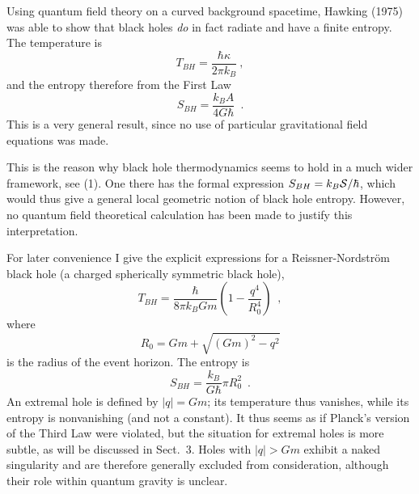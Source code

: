 \documentclass[12pt]{article}
\newcommand{\be}{\begin{equation}}
\newcommand{\ee}{\end{equation}}
\begin{document}
Using quantum field theory on a curved background
spacetime, Hawking (1975) was able to show that black holes
{\em do} in fact radiate and have a finite entropy. The temperature is
\be T_{BH}=\frac{\hbar\kappa}{2\pi k_B}\ , \ee
and the entropy therefore from the First Law
\be S_{BH}=\frac{k_BA}{4G\hbar}\enspace . \ee
This is a very general result, since no use of particular
gravitational field equations was made.

\vskip 2mm
\small

This is the reason why black hole thermodynamics seems to hold
in a much wider framework, see (1). One there has
the formal expression $S_{BH}=
k_B{\cal S}/\hbar$, which would thus give a general local geometric
notion of black hole entropy. However, no quantum field theoretical
calculation has been made to justify this interpretation.

\vskip 2mm
\normalsize

For later convenience I give the explicit expressions for a
Reissner-Nordstr\"om black hole (a charged spherically symmetric
black hole),
\be T_{BH}=\frac{\hbar}{8\pi k_BGm}\left(1-\frac{q^4}{R_0^4}
    \right)\enspace , \ee
where
\be R_0=Gm+\sqrt{(Gm)^2-q^2} \ee
is the radius of the event horizon. The entropy is
\be S_{BH}=\frac{k_B}{G\hbar}\pi R_0^2\enspace .\ee
An extremal hole is defined by $\vert q\vert=Gm$; its temperature
thus vanishes, while its entropy is nonvanishing
 (and not a constant).
It thus seems as if Planck's version of the Third Law were violated,
but the situation for extremal holes is more subtle, as will
be discussed in Sect.~3. Holes with $\vert q\vert>Gm$ exhibit
a naked singularity and are therefore generally excluded
from consideration, although their role within quantum gravity
is unclear.
\end{document}
